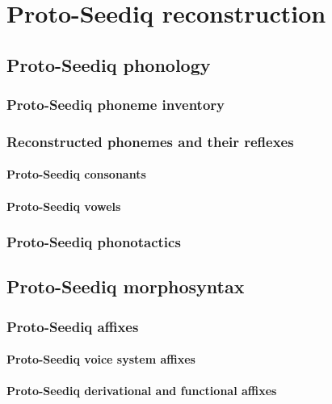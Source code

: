 \chapter{Proto-Seediq reconstruction}\label{ch4}
\lipsum[1-2]

\section{Proto-Seediq phonology}
\lipsum[1]

\subsection{Proto-Seediq phoneme inventory}
\lipsum[1]

\subsection{Reconstructed phonemes and their reflexes}
\lipsum[1]

\subsubsection{Proto-Seediq consonants}
\lipsum[1]

\subsubsection{Proto-Seediq vowels}
\lipsum[1]

\subsection{Proto-Seediq phonotactics}
\lipsum[1]


\section{Proto-Seediq morphosyntax}
\lipsum[1]

\subsection{Proto-Seediq affixes}
\lipsum[1]

\subsubsection{Proto-Seediq voice system affixes}
\lipsum[1]

\subsubsection{Proto-Seediq derivational and functional affixes}
\lipsum[1]


